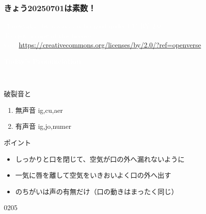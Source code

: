 \documentclass[aspectratio=169,xcolor={dvipsnames,table}]{beamer}
\begin{document}
{
  \begin{frame}[b]
    \frametitle{きょう20250701は素数！}
\tiny
\raggedright
  \textcolor{white}{ ``Fireworks'' by bayasaa is licensed under CC BY 2.0. }\\
   \textcolor{white}{To view a copy of this license,}\\
   \textcolor{white}{visit \url{https://creativecommons.org/licenses/by/2.0/?ref=openverse}.}
\hfill\hyperlink{today}{}
  \end{frame}
}
\begin{frame}
\centering
  \textcolor{white}{\Huge\bfseries Today's Pronunciation}

 \vspace{30pt}

  \textcolor{white}{\Huge\bfseries {}, }
\end{frame}
\begin{frame}[plain,label=slide_p_b]{破裂音と}

\large

\begin{enumerate}
 \item 無声音 \hspace{20pt}ig,\hspace{1\zw}cu,\hspace{1\zw}aer
 \item  有声音 \hspace{20pt}ig,\hspace{1\zw}jo,\hspace{1\zw}numer
\end{enumerate}

\vspace*{20pt}

\normalsize
ポイント

\begin{itemize}[circle]
 \item しっかりと口を閉じて、空気が口の外へ漏れないように
 \item 一気に唇を離して空気をいきおいよく口の外へ出す
 \item {}のちがいは声の有無だけ（口の動きはまったく同じ）
\end{itemize}


\bigskip



\hfill{\tiny 0205}\,{\scriptsize {}}

\end{frame}
\end{document}
